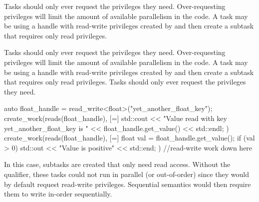 Tasks should only ever request the privileges they need. 
Over-requesting privileges will limit the amount of available parallelism in the code.
A task may be using a handle with read-write privileges created by 
and then create a subtask that requires only read privileges.


Tasks should only ever request the privileges they need. 
Over-requesting privileges will limit the amount of available parallelism in the code.
A task may be using a handle with read-write privileges created by 
and then create a subtask that requires only read privileges.
Tasks should only ever request the privileges they need. 

\begin{CppCode}
auto float_handle = read_write<float>("yet_another_float_key");
create_work(reads(float_handle), [=] {
  std::cout << "Value read with key yet_another_float_key is " 
          << float_handle.get_value() << std::endl;
})
create_work(reads(float_handle), [=] {
  float val = float_handle.get_value();
  if (val > 0) std::out << "Value is positive" << std::end;
})
//read-write work down here
\end{CppCode}
In this case, subtasks are created that only need read access. 
Without the  qualifier, these tasks could not run in parallel (or out-of-order) since they
would by default request read-write privileges.
Sequential semantics would then require them to write in-order sequentially.

